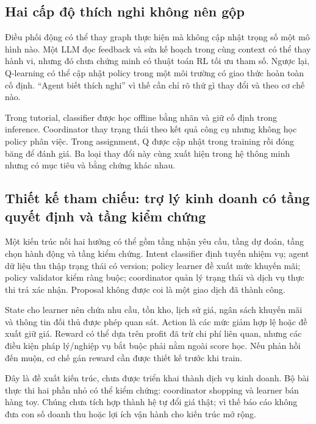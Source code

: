 \subsection{Hai cấp độ thích nghi không nên
gộp}\label{hai-cux1ea5p-ux111ux1ed9-thuxedch-nghi-khuxf4ng-nuxean-gux1ed9p}

Điều phối động có thể thay graph thực hiện mà không cập nhật trọng số
một mô hình nào. Một LLM đọc feedback và sửa kế hoạch trong cùng context
có thể thay hành vi, nhưng đó chưa chứng minh có thuật toán RL tối ưu
tham số. Ngược lại, Q-learning có thể cập nhật policy trong một môi
trường có giao thức hoàn toàn cố định. ``Agent biết thích nghi'' vì thế
cần chỉ rõ thứ gì thay đổi và theo cơ chế nào.

Trong tutorial, classifier được học offline bằng nhãn và giữ cố định
trong inference. Coordinator thay trạng thái theo kết quả công cụ nhưng
không học policy phân việc. Trong assignment, Q được cập nhật trong
training rồi đóng băng để đánh giá. Ba loại thay đổi này cùng xuất hiện
trong hệ thông minh nhưng có mục tiêu và bằng chứng khác nhau.

\subsection{Thiết kế tham chiếu: trợ lý kinh doanh có tầng quyết định và
tầng kiểm
chứng}\label{thiux1ebft-kux1ebf-tham-chiux1ebfu-trux1ee3-luxfd-kinh-doanh-cuxf3-tux1ea7ng-quyux1ebft-ux111ux1ecbnh-vuxe0-tux1ea7ng-kiux1ec3m-chux1ee9ng}

Một kiến trúc nối hai hướng có thể gồm tầng nhận yêu cầu, tầng dự đoán,
tầng chọn hành động và tầng kiểm chứng. Intent classifier định tuyến
nhiệm vụ; agent dữ liệu thu thập trạng thái có version; policy learner
đề xuất mức khuyến mãi; policy validator kiểm ràng buộc; coordinator
quản lý trạng thái và dịch vụ thực thi trả xác nhận. Proposal không được
coi là một giao dịch đã thành công.

State cho learner nên chứa nhu cầu, tồn kho, lịch sử giá, ngân sách
khuyến mãi và thông tin đối thủ được phép quan sát. Action là các mức
giảm hợp lệ hoặc đề xuất giữ giá. Reward có thể dựa trên profit đã trừ
chi phí liên quan, nhưng các điều kiện pháp lý/nghiệp vụ bắt buộc phải
nằm ngoài score học. Nếu phản hồi đến muộn, cơ chế gán reward cần được
thiết kế trước khi train.

Đây là đề xuất kiến trúc, chưa được triển khai thành dịch vụ kinh doanh.
Bộ bài thực thi hai phần nhỏ có thể kiểm chứng: coordinator shopping và
learner bán hàng toy. Chúng chưa tích hợp thành hệ tự đổi giá thật; vì
thế báo cáo không đưa con số doanh thu hoặc lợi ích vận hành cho kiến
trúc mở rộng.

